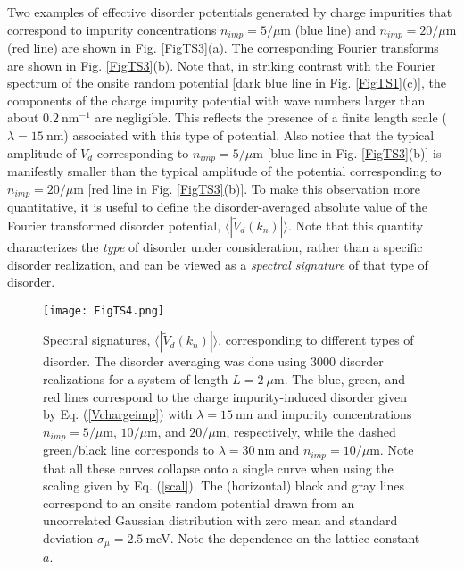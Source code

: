 \documentclass[aps,prmaterials,twocolumn,superscriptaddress,longbibliography]{revtex4-2}
\begin{document}
Two examples of effective disorder potentials generated by charge impurities that  correspond to impurity concentrations $n_{imp}=5/\mu$m (blue line) and  $n_{imp}=20/\mu$m (red line) are shown in Fig. \ref{FigTS3}(a). The corresponding Fourier transforms are shown in Fig. \ref{FigTS3}(b). Note that, in striking contrast with the Fourier spectrum of the onsite random potential [dark blue line in Fig. \ref{FigTS1}(c)], the components of the charge impurity potential with wave numbers larger than about $0.2~$nm$^{-1}$ are negligible. This reflects the presence of a finite length scale ($\lambda=15~$nm) associated with this type of potential. Also notice that the typical amplitude of $\widetilde{V}_d$ corresponding to $n_{imp}=5/\mu$m [blue line in Fig. \ref{FigTS3}(b)] is manifestly smaller than the typical amplitude of the potential corresponding to $n_{imp}=20/\mu$m  [red line in Fig. \ref{FigTS3}(b)]. To make this observation more quantitative, it is useful to define the disorder-averaged absolute value of the Fourier transformed disorder potential, $\langle|\widetilde{V}_d(k_n)|\rangle$. Note that this quantity characterizes the {\em type} of disorder under consideration, rather than a specific disorder realization, and can be viewed as a {\em spectral signature} of that type of disorder. 

\begin{figure}[t]
\begin{center}
\texttt{[image: FigTS4.png]}
\end{center}
\vspace{-3mm}
\caption{Spectral signatures, $\langle|\widetilde{V}_d(k_n)|\rangle$, corresponding to different types of disorder. The disorder averaging was done using 3000 disorder realizations for a system of length $L=2~\mu$m. The blue, green, and red lines correspond to the charge impurity-induced disorder given by Eq. (\ref{Vchargeimp}) with $\lambda=15~$nm and impurity concentrations $n_{imp}=5/\mu$m, $10/\mu$m, and $20/\mu$m, respectively, while the dashed green/black line corresponds to $\lambda=30~$nm and $n_{imp}=10/\mu$m. Note that all these curves collapse onto a single curve when using the scaling given by Eq. (\ref{scal}).  The (horizontal) black and gray lines correspond to an onsite random potential drawn from an uncorrelated Gaussian distribution with zero mean and standard deviation $\sigma_\mu = 2.5~$meV. Note the dependence on the lattice constant $a$.}
\label{FigTS4}
\vspace{-1mm}
\end{figure}
\end{document}
